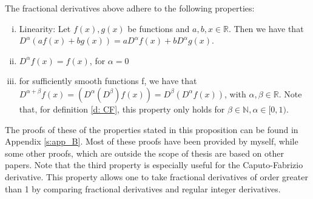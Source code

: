 \begin{proposition}\label{p: calculus}
    The fractional derivatives above adhere to the following properties:
    \begin{enumerate}[(i)]
        \item Linearity: Let \(f(x), g(x)\) be functions and \(a, b, x \in \mathbb{R}\). Then we have that \(D^{\alpha} (a f(x) + b g(x)) = a D^{\alpha} f(x) + b D^{\alpha} g(x)\).
        \item \(D^{\alpha} f(x) = f(x)\), for \(\alpha = 0\) 
        \item for sufficiently smooth functions f, we have that \(D^{\alpha + \beta} f(x) = (D^\alpha(D^\beta) f(x)) =  D^\beta(D^\alpha f(x))\), with \(\alpha, \beta \in \mathbb{R}\). Note that, for definition \ref{d: CF}, this property only holds for \(\beta \in \mathbb{N}, \alpha \in [0,1)\).
    \end{enumerate}
        
    
\end{proposition}

The proofs of these of the properties stated in this proposition can be found in Appendix \ref{s:app_B}. Most of these proofs have been provided by myself, while some other proofs, which are outside the scope of thesis are based on other papers. Note that the third property is especially useful for the Caputo-Fabrizio derivative. This property allows one to take fractional derivatives of order greater than 1 by comparing fractional derivatives and regular integer derivatives.

